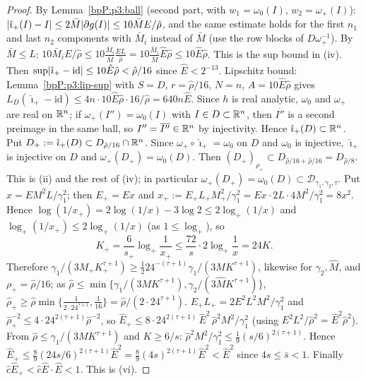 \begin{proof}
By Lemma~\ref{bpP:p3:ball} (second part, with $w_1=\omega_0(I)$, $w_2=\omega_+(I)$): $\lvert \hat\imath_+(I)-I\rvert\le2\bar M\lvert \partial g(I)\rvert\le10\bar ME/\hat\rho$, and the same estimate holds for the first $n_1$ and last $n_2$ components with $\bar M_i$ instead of $\bar M$ (use the row blocks of $D\omega_+^{-1}$). By $\bar M\le L$: $10\bar M_iE/\hat\rho\le10\frac{\bar M_i}{\bar M}\frac{EL}{\hat\rho}=10\frac{\bar M_i}{\bar M}\hat E\hat\rho\le10\hat E\hat\rho$. This is the sup bound in (iv). Then $\sup\lvert \hat\imath_+-\mathrm{id}\rvert\le10\hat E\hat\rho<\hat\rho/16$ since $\hat E<2^{-13}$.
Lipschitz bound: Lemma~\ref{bpP:p3:lip-sup} with $S=D$, $r=\hat\rho/16$, $N=n$, $A=10\hat E\hat\rho$ gives $L_D(\hat\imath_+-\mathrm{id})\le4n\cdot10\hat E\hat\rho\cdot16/\hat\rho=640n\hat E$. Since $h$ is real analytic, $\omega_0$ and $\omega_+$ are real on $\mathbb{R}^n$; if $\omega_+(I'')=\omega_0(I)$ with $I\in D\subset\mathbb{R}^n$, then $\overline{I''}$ is a second preimage in the same ball, so $I''=\overline{I''}\in\mathbb{R}^n$ by injectivity. Hence $\hat\imath_+(D)\subset\mathbb{R}^n$. Put $D_+:=\hat\imath_+(D)\subset D_{\hat\rho/16}\cap\mathbb{R}^n$. Since $\omega_+\circ\hat\imath_+=\omega_0$ on $D$ and $\omega_0$ is injective, $\hat\imath_+$ is injective on $D$ and $\omega_+(D_+)=\omega_0(D)$. Then $(D_+)_{\rho_+}\subset D_{\hat\rho/16+\hat\rho/16}=D_{\hat\rho/8}$. This is (ii) and the rest of (iv); in particular $\omega_+(D_+)=\omega_0(D)\subset\mathcal D_{\gamma_1,\gamma_2,\tau}$.
\label{stepP:p3:st-const}
Put $x=EM^2L/\gamma_1^2$; then $E_+=Ex$ and $x_+:=E_+L_+M_+^2/\gamma_1^2=Ex\cdot2L\cdot4M^2/\gamma_1^2=8x^2$. Hence $\log(1/x_+)=2\log(1/x)-3\log2\le2\log_+(1/x)$ and $\log_+(1/x_+)\le2\log_+(1/x)$ (as $1\le\log_+$), so
\[K_+=\frac6{s_+}\log_+\frac1{x_+}\le\frac{72}{s}\cdot2\log_+\frac1x=24K.\]
Therefore $\gamma_1/(3M_+K_+^{\tau+1})\ge\frac12 24^{-(\tau+1)}\gamma_1/(3MK^{\tau+1})$, likewise for $\gamma_2,\hat M$, and $\rho_+=\hat\rho/16$; as $\hat\rho\le\min\{\gamma_1/(3MK^{\tau+1}),\gamma_2/(3\hat MK^{\tau+1})\}$, $\hat\rho_+\ge\hat\rho\min\{\frac1{2\cdot24^{\tau+1}},\frac1{16}\}=\hat\rho/(2\cdot24^{\tau+1})$.
\label{stepP:p3:st-quad}
$E_+L_+=2E^2L^2M^2/\gamma_1^2$ and $\hat\rho_+^{-2}\le4\cdot24^{2(\tau+1)}\hat\rho^{-2}$, so $\hat E_+\le8\cdot24^{2(\tau+1)}\,\hat E^2\,\hat\rho^2M^2/\gamma_1^2$ (using $E^2L^2/\hat\rho^2=\hat E^2\hat\rho^2$). From $\hat\rho\le\gamma_1/(3MK^{\tau+1})$ and $K\ge6/s$: $\hat\rho^2M^2/\gamma_1^2\le\frac19(s/6)^{2(\tau+1)}$. Hence $\hat E_+\le\frac89(24s/6)^{2(\tau+1)}\hat E^2=\frac89(4s)^{2(\tau+1)}\hat E^2<\hat E^2$ since $4s\le\bar s<1$. Finally $\hat c\hat E_+<\hat c\hat E\cdot\hat E<1$. This is (vi).
\end{proof}

